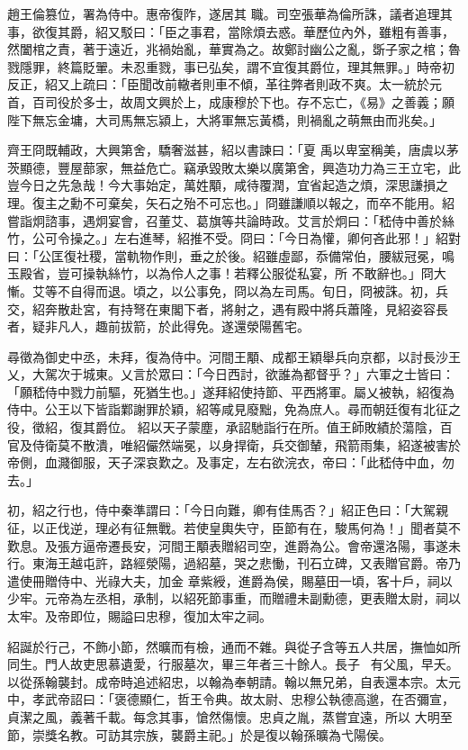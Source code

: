 \begin{pinyinscope}
 趙王倫篡位，署為侍中。惠帝復阼，遂居其
 職。司空張華為倫所誅，議者追理其事，欲復其爵，紹又駁曰：「臣之事君，當除煩去惑。華歷位內外，雖粗有善事，然闔棺之責，著于遠近，兆禍始亂，華實為之。故鄭討幽公之亂，斲子家之棺；魯戮隱罪，終篇貶翬。未忍重戮，事已弘矣，謂不宜復其爵位，理其無罪。」時帝初反正，紹又上疏曰：「臣聞改前轍者則車不傾，革往弊者則政不爽。太一統於元首，百司役於多士，故周文興於上，成康穆於下也。存不忘亡，《易》之善義；願陛下無忘金墉，大司馬無忘潁上，大將軍無忘黃橋，則禍亂之萌無由而兆矣。」



 齊王冏既輔政，大興第舍，驕奢滋甚，紹以書諫曰：「夏
 禹以卑室稱美，唐虞以茅茨顯德，豐屋蔀家，無益危亡。竊承毀敗太樂以廣第舍，興造功力為三王立宅，此豈今日之先急哉！今大事始定，萬姓顒，咸待覆潤，宜省起造之煩，深思謙損之理。復主之勳不可棄矣，矢石之殆不可忘也。」冏雖謙順以報之，而卒不能用。紹嘗詣炯諮事，遇炯宴會，召董艾、葛旗等共論時政。艾言於炯曰：「嵇侍中善於絲竹，公可令操之。」左右進琴，紹推不受。冏曰：「今日為懽，卿何吝此邪！」紹對曰：「公匡復社稷，當軌物作則，垂之於後。紹雖虛鄙，忝備常伯，腰紱冠冕，鳴玉殿省，豈可操執絲竹，以為伶人之事！若釋公服從私宴，所
 不敢辭也。」冏大慚。艾等不自得而退。頃之，以公事免，冏以為左司馬。旬日，冏被誅。初，兵交，紹奔散赴宮，有持弩在東閣下者，將射之，遇有殿中將兵蕭隆，見紹姿容長者，疑非凡人，趣前拔箭，於此得免。遂還滎陽舊宅。



 尋徵為御史中丞，未拜，復為侍中。河間王顒、成都王穎舉兵向京都，以討長沙王乂，大駕次于城東。乂言於眾曰：「今日西討，欲誰為都督乎？」六軍之士皆曰：「願嵇侍中戮力前驅，死猶生也。」遂拜紹使持節、平西將軍。屬乂被執，紹復為侍中。公王以下皆詣鄴謝罪於穎，紹等咸見廢黜，免為庶人。尋而朝廷復有北征之役，徵紹，復其爵位。
 紹以天子蒙塵，承詔馳詣行在所。值王師敗績於蕩陰，百官及侍衛莫不散潰，唯紹儼然端冕，以身捍衛，兵交御輦，飛箭雨集，紹遂被害於帝側，血濺御服，天子深哀歎之。及事定，左右欲浣衣，帝曰：「此嵇侍中血，勿去。」



 初，紹之行也，侍中秦準謂曰：「今日向難，卿有佳馬否？」紹正色曰：「大駕親征，以正伐逆，理必有征無戰。若使皇輿失守，臣節有在，駿馬何為！」聞者莫不歎息。及張方逼帝遷長安，河間王顒表贈紹司空，進爵為公。會帝還洛陽，事遂未行。東海王越屯許，路經滎陽，過紹墓，哭之悲慟，刊石立碑，又表贈官爵。帝乃遣使冊贈侍中、光祿大夫，加金
 章紫綬，進爵為侯，賜墓田一頃，客十戶，祠以少牢。元帝為左丞相，承制，以紹死節事重，而贈禮未副勳德，更表贈太尉，祠以太牢。及帝即位，賜謚曰忠穆，復加太牢之祠。



 紹誕於行己，不飾小節，然曠而有檢，通而不雜。與從子含等五人共居，撫恤如所同生。門人故吏思慕遺愛，行服墓次，畢三年者三十餘人。長子，有父風，早夭。以從孫翰襲封。成帝時追述紹忠，以翰為奉朝請。翰以無兄弟，自表還本宗。太元中，孝武帝詔曰：「褒德顯仁，哲王令典。故太尉、忠穆公執德高邈，在否彌宣，貞潔之風，義著千載。每念其事，愴然傷懷。忠貞之胤，蒸嘗宜遠，所以
 大明至節，崇獎名教。可訪其宗族，襲爵主祀。」於是復以翰孫曠為弋陽侯。




\end{pinyinscope}
